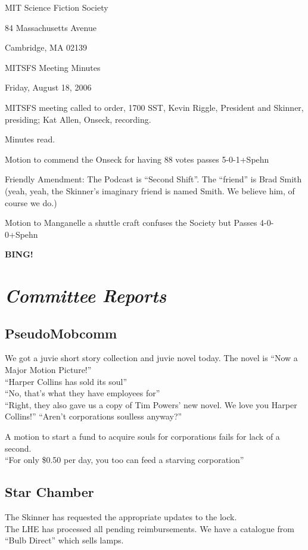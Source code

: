\documentclass[10pt]{article}
\newcommand{\bing}{{\bf BING!} }
\newcommand{\goto}[1]{\bing \vskip 12pt \section*{{\em{#1}}}}
\begin{document}
\begin{center}

MIT Science Fiction Society

84 Massachusetts Avenue

Cambridge, MA 02139

\vspace{12pt}

MITSFS Meeting Minutes

Friday, August 18, 2006

\end{center}

\vspace{18pt}

\setlength{\parskip}{6pt}

\noindent
MITSFS meeting called to order, 1700 SST,
Kevin Riggle, President and Skinner, presiding; Kat Allen, Onseck, recording.

Minutes read.

Motion to commend the Onseck for having 88 votes passes 5-0-1+Spehn

Friendly Amendment: The Podcast is ``Second Shift''.  The ``friend''
is Brad Smith (yeah, yeah, the Skinner's imaginary friend is named
Smith. We believe him, of course we do.)

Motion to Manganelle a shuttle craft confuses the Society but Passes 4-0-0+Spehn

\goto{Committee Reports}

\subsection{PseudoMobcomm}
We got a juvie short story collection and juvie novel today. The
novel is ``Now a Major Motion Picture!''\\
``Harper Collins has sold its soul''\\
``No, that's what they have employees for''\\
``Right, they also gave us a copy of Tim Powers' new novel. We love
you Harper Collins!''
``Aren't corporations soulless anyway?''

A motion to start a fund to acquire souls for corporations fails for
lack of a second.\\
``For only \$0.50 per day, you too can feed a starving corporation''


\subsection*{Star Chamber}
The Skinner has requested the appropriate updates to the lock.\\
The LHE has processed all pending reimbursements.
We have a catalogue from ``Bulb Direct'' which sells lamps.
\end{document}
